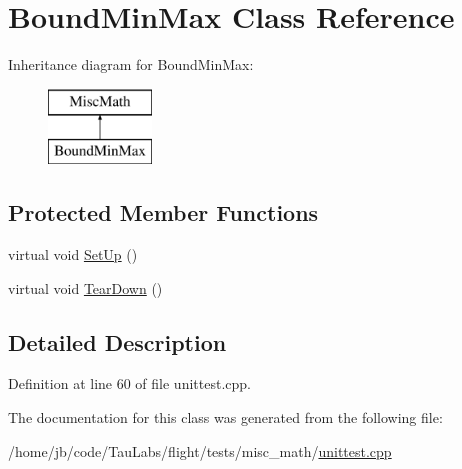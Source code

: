 \hypertarget{class_bound_min_max}{\section{\-Bound\-Min\-Max \-Class \-Reference}
\label{class_bound_min_max}
}
\-Inheritance diagram for \-Bound\-Min\-Max\-:\begin{figure}[H]
\begin{center}
\leavevmode
\includegraphics[height=2.000000cm]{class_bound_min_max}
\end{center}
\end{figure}
\subsection*{\-Protected \-Member \-Functions}
\begin{DoxyCompactItemize}
\item 
virtual void \hyperlink{group___unit_tests_gaa083f26ac602b6553ebd522ebce74b44}{\-Set\-Up} ()
\item 
virtual void \hyperlink{group___unit_tests_ga5b1a04dbcaaa9db5e928c59c87d81a69}{\-Tear\-Down} ()
\end{DoxyCompactItemize}


\subsection{\-Detailed \-Description}


\-Definition at line 60 of file unittest.\-cpp.



\-The documentation for this class was generated from the following file\-:\begin{DoxyCompactItemize}
\item 
/home/jb/code/\-Tau\-Labs/flight/tests/misc\-\_\-math/\hyperlink{misc__math_2unittest_8cpp}{unittest.\-cpp}\end{DoxyCompactItemize}
